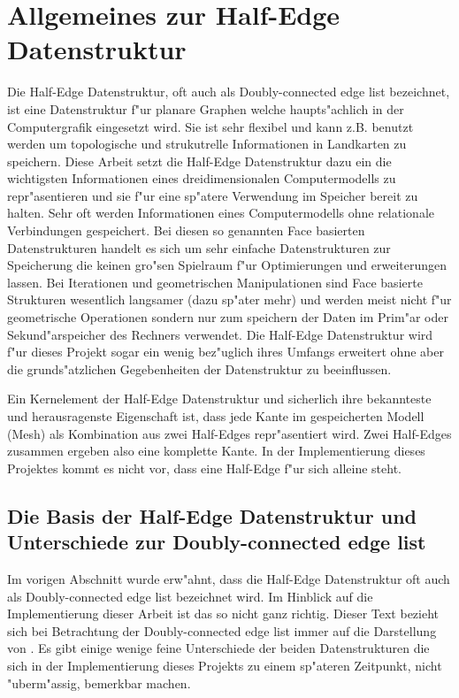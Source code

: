 \documentclass[pagesize, paper=a4, fontsize=12pt,titlepage=true, headings=small, headnosepline, abstractoff, liststotoc, nochapterprefix, plainheadsepline]{scrreprt}
\newcommand{\HES}{Half-Edge Datenstruktur }
\begin{document}
	\section {Allgemeines zur \HES}
		Die Half-Edge Datenstruktur, oft auch als Doubly-connected edge list bezeichnet, ist eine Datenstruktur f"ur planare Graphen welche haupts"achlich in der Computergrafik eingesetzt wird. Sie ist sehr flexibel und kann z.B. benutzt werden um topologische und strukutrelle Informationen in Landkarten zu speichern. Diese Arbeit setzt die \HES dazu ein die wichtigsten Informationen eines dreidimensionalen Computermodells zu repr"asentieren und sie f"ur eine sp"atere Verwendung im Speicher bereit zu halten. Sehr oft werden Informationen eines Computermodells ohne relationale Verbindungen gespeichert. Bei diesen so genannten Face basierten Datenstrukturen handelt es sich um sehr einfache Datenstrukturen zur Speicherung die keinen gro"sen Spielraum f"ur Optimierungen und erweiterungen lassen. Bei Iterationen und geometrischen Manipulationen sind Face basierte Strukturen wesentlich langsamer (dazu sp"ater mehr) und werden meist nicht f"ur geometrische Operationen sondern nur zum speichern der Daten im Prim"ar oder Sekund"arspeicher des Rechners verwendet. Die \HES wird f"ur dieses Projekt sogar ein wenig bez"uglich ihres Umfangs erweitert ohne aber die grunds"atzlichen Gegebenheiten der Datenstruktur zu beeinflussen.

Ein Kernelement der \HES und sicherlich ihre bekannteste und herausragenste Eigenschaft ist, dass jede Kante im gespeicherten Modell (Mesh) als Kombination aus zwei Half-Edges repr"asentiert wird. Zwei Half-Edges zusammen ergeben also eine komplette Kante. In der Implementierung dieses Projektes kommt es nicht vor, dass eine Half-Edge f"ur sich alleine steht.
		\subsection {Die Basis der Half-Edge Datenstruktur und Unterschiede zur Doubly-connected edge list}
			Im vorigen Abschnitt wurde erw"ahnt, dass die \HES oft auch als Doubly-connected edge list bezeichnet wird. Im Hinblick auf die Implementierung dieser Arbeit ist das so nicht ganz richtig. Dieser Text bezieht sich bei Betrachtung der Doubly-connected edge list immer auf die Darstellung von \cite{vanMarkdeBerg.2008}. Es gibt einige wenige feine Unterschiede der beiden Datenstrukturen die sich in der Implementierung dieses Projekts zu einem sp"ateren Zeitpunkt, nicht "uberm"assig, bemerkbar machen.
\end{document}

